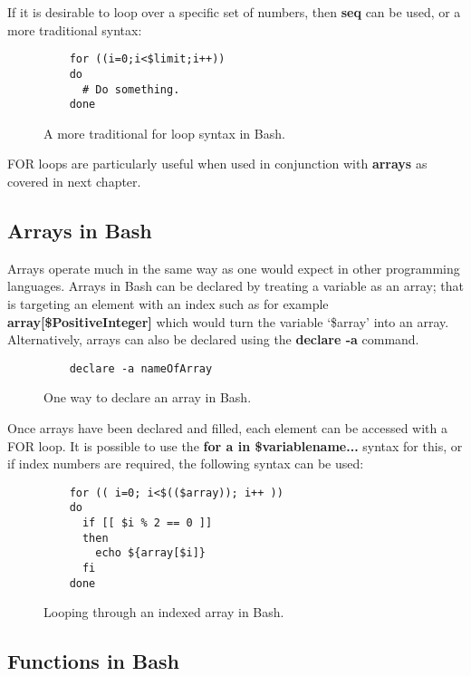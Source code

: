 \documentclass{article}
\begin{document}
If it is desirable to loop over a specific set of numbers, then \textbf{seq} can be used, or a more traditional syntax:

\begin{figure}[h]
  \lstset{language=Bash}
  \begin{lstlisting}
    for ((i=0;i<$limit;i++))
    do
      # Do something.
    done
  \end{lstlisting}
  \label{bash5}
  \caption{A more traditional for loop syntax in Bash.}
\end{figure}

FOR loops are particularly useful when used in conjunction with \textbf{arrays} as covered in next chapter.

\subsection{Arrays in Bash}

Arrays operate much in the same way as one would expect in other programming languages. Arrays in Bash can be declared by treating a variable as an array; that is
targeting an element with an index such as for example \textbf{array[\$PositiveInteger]} which would turn the variable `\$array' into an array.
Alternatively, arrays can also be declared using the \textbf{declare -a} command.

\begin{figure}[h]
  \lstset{language=Bash}
  \begin{lstlisting}
    declare -a nameOfArray
  \end{lstlisting}
  \label{bash6}
  \caption{One way to declare an array in Bash.}
\end{figure}

Once arrays have been declared and filled, each element can be accessed with a FOR loop. It is possible to use the \textbf{for a in \$variablename...} syntax for this,
or if index numbers are required, the following syntax can be used:

\begin{figure}[h]
  \lstset{language=Bash}
  \begin{lstlisting}
    for (( i=0; i<$(($array)); i++ ))
    do
      if [[ $i % 2 == 0 ]]
      then
        echo ${array[$i]}
      fi
    done
  \end{lstlisting}
  \label{bash7}
  \caption{Looping through an indexed array in Bash.}
\end{figure}

\subsection{Functions in Bash}
\end{document}
